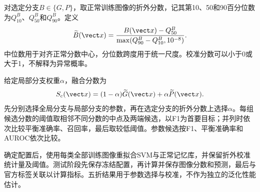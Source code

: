 对选定分支$B\in\{G,P\}$，取正常训练图像的折外分数，记其第10、50和90百分位数为$Q_{10}^{B}$、$Q_{50}^{B}$和$Q_{90}^{B}$。定义
\begin{equation}
 \widetilde B(\vect x)=\frac{B(\vect x)-Q_{50}^{B}}
 {\max(Q_{90}^{B}-Q_{10}^{B},10^{-8})}.
 \label{eq:calibration}
\end{equation}
中位数用于对齐正常分数中心，分位数跨度用于统一尺度。校准分数可以小于0或大于1，不解释为异常概率。

给定局部分支权重$\alpha$，融合分数为
\begin{equation}
 S_c(\vect x)=(1-\alpha)\widetilde G(\vect x)+\alpha\widetilde P(\vect x).
 \label{eq:fusion}
\end{equation}
先分别选择全局分支与局部分支的参数，再在选定分支的折外分数上选择$\alpha$。每组候选分数的阈值取相邻不同分数的中点及两端候选，以F1为首要目标；并列时依次比较平衡准确率、召回率，最后取较低阈值。参数候选按F1、平衡准确率和AUROC依次比较。

确定配置后，使用每类全部训练图像重拟合SVM与正常记忆库，并保留折外校准统计量及阈值。测试阶段先保存冻结配置，再计算并保存图像分数和预测，最后与官方标签关联以计算指标。五折结果用于参数选择与校准，不作为独立的泛化性能估计。
